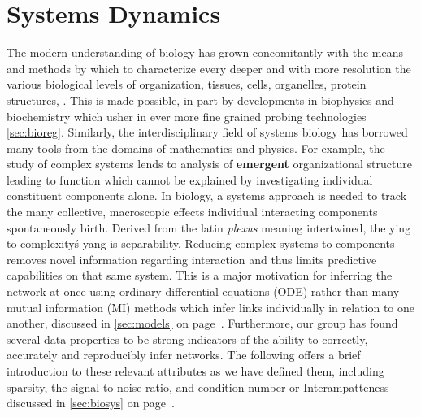 % 
\section{Systems Dynamics}
\label{sec:sysdyn}
The modern understanding of biology has grown concomitantly with the means and methods by which to characterize every deeper and with more resolution the various biological levels of organization, \ie tissues, cells, organelles, protein structures, \etc. This is made possible, in part by developments in biophysics and biochemistry which usher in ever more fine grained probing technologies \cref{sec:bioreg}. %
Similarly, the interdisciplinary field of systems biology has borrowed many tools from the domains of mathematics and physics. For example, the study of complex systems lends to analysis of \textbf{emergent} organizational structure leading to function which cannot be explained by investigating individual constituent components alone. In biology, a systems approach is needed to track the many collective, macroscopic effects individual interacting components spontaneously birth. Derived from the latin \emph{plexus} meaning intertwined, the ying to complexity\'s yang is separability. Reducing complex systems to components removes novel information regarding interaction and thus limits predictive capabilities on that same system. This is a major motivation for inferring the network at once using ordinary differential equations (ODE) rather than many mutual information (MI) methods which infer links individually in relation to one another, discussed in \cref{sec:models} on page~\pageref{sec:models}. Furthermore, our group has found several data properties to be strong indicators of the ability to correctly, accurately and reproducibly infer networks. The following offers a brief introduction to these relevant attributes as we have defined them, including sparsity, the signal-to-noise ratio, and condition number or Interampatteness discussed in \cref{sec:biosys} on page~\pageref{sec:biosys}.


